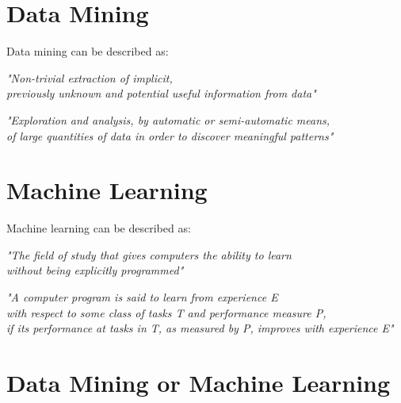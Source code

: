 \section{Data Mining}

Data mining can be described as:

\begin{center}
    \textit{"Non-trivial extraction of implicit, \\
    previously unknown and potential useful information from data"}
\end{center}

\begin{center}
    \textit{"Exploration and analysis, by automatic or semi-automatic means, \\
    of large quantities of data in order to discover meaningful patterns"}
\end{center}


\section{Machine Learning}

Machine learning can be described as:

\begin{center}
    \textit{"The field of study that gives computers the ability to learn \\
    without being explicitly programmed"}
\end{center}

\begin{center}
    \textit{"A computer program is said to learn from experience E \\
     with respect to some class of tasks T and performance measure P, \\
     if its performance at tasks in T, as measured by P, improves with experience E"}
\end{center}

\newpage
\section{Data Mining or Machine Learning}

